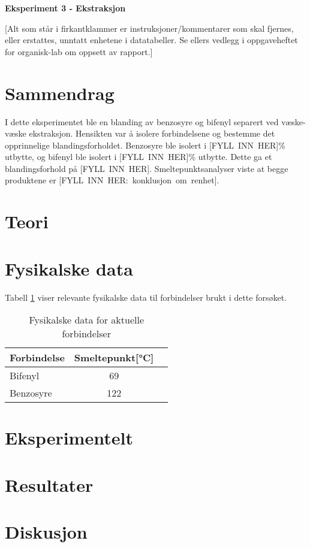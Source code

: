 \begin{center} %
\LARGE{\textbf{Eksperiment 3 - Ekstraksjon}}
\end{center}
[Alt som står i firkantklammer er instruksjoner/kommentarer som skal fjernes, eller erstattes, unntatt enhetene i datatabeller. Se ellers vedlegg i oppgaveheftet for organisk-lab om oppsett av rapport.]
\section*{Sammendrag}
I dette eksperimentet ble en blanding av benzosyre og bifenyl separert ved væske-væske ekstraksjon. Hensikten var å isolere forbindelsene og bestemme det opprinnelige blandingsforholdet. Benzosyre ble isolert i [FYLL INN HER]\% utbytte, og bifenyl ble isolert i [FYLL INN HER]\% utbytte. Dette ga et blandingsforhold på [FYLL INN HER]. Smeltepunktsanalyser viste at begge produktene er [FYLL INN HER: konklusjon om renhet].




\section{Teori}


\section{Fysikalske data}
Tabell \ref{tab:fysdata} viser relevante fysikalske data til forbindelser brukt i dette forsøket. 
\begin{table}[ht!]
	\begin{center}
		\caption{Fysikalske data for aktuelle forbindelser \cite{CRC}}
		\label{tab:fysdata}
		\begin{tabular}{l c c}
		\toprule
		Forbindelse & Smeltepunkt[\si{\celsius}]\\
		\midrule
		Bifenyl & 69\\
		Benzosyre & 122\\
		\bottomrule
		\end{tabular}
	\end{center}
\end{table}



\section{Eksperimentelt}

\section{Resultater}

\section{Diskusjon}
